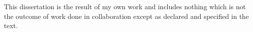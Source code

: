 \noindent
This dissertation is the result of my own work and includes nothing which is not the outcome of work done in collaboration except as declared and specified in the text.

